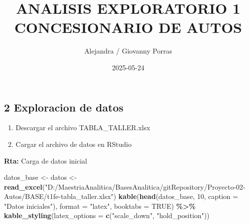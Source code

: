 \documentclass[
]{article}
\title{ANALISIS EXPLORATORIO 1 CONCESIONARIO DE AUTOS}
\author{Alejandra / Giovanny Porras}
\date{2025-05-24}
\newenvironment{Shaded}{\begin{snugshade}}{\end{snugshade}}
\newcommand{\AttributeTok}[1]{\textcolor[rgb]{0.13,0.29,0.53}{#1}}
\newcommand{\ConstantTok}[1]{\textcolor[rgb]{0.56,0.35,0.01}{#1}}
\newcommand{\DecValTok}[1]{\textcolor[rgb]{0.00,0.00,0.81}{#1}}
\newcommand{\FunctionTok}[1]{\textcolor[rgb]{0.13,0.29,0.53}{\textbf{#1}}}
\newcommand{\NormalTok}[1]{#1}
\newcommand{\OtherTok}[1]{\textcolor[rgb]{0.56,0.35,0.01}{#1}}
\newcommand{\SpecialCharTok}[1]{\textcolor[rgb]{0.81,0.36,0.00}{\textbf{#1}}}
\newcommand{\StringTok}[1]{\textcolor[rgb]{0.31,0.60,0.02}{#1}}
\providecommand{\tightlist}{%
  \setlength{\itemsep}{0pt}\setlength{\parskip}{0pt}}
\begin{document}
\maketitle

{
\setcounter{tocdepth}{2}
\tableofcontents
}
\subsection{2 Exploracion de datos}\label{exploracion-de-datos}

\begin{enumerate}
\def\labelenumi{\alph{enumi}.}
\tightlist
\item
  Descargar el archivo TABLA\_TALLER.xlsx
\item
  Cargar el archivo de datos en RStudio
\end{enumerate}

\textbf{Rta:} Carga de datos inicial

\begin{Shaded}
\begin{Highlighting}[]
\NormalTok{datos\_base }\OtherTok{\textless{}{-}}\NormalTok{ datos }\OtherTok{\textless{}{-}} \FunctionTok{read\_excel}\NormalTok{(}\StringTok{"D:/MaestriaAnalitica/BasesAnalitica/gitRepository/Proyecto{-}02{-}Autos/BASE/t1fe{-}tabla\_taller.xlsx"}\NormalTok{)}
\FunctionTok{kable}\NormalTok{(}\FunctionTok{head}\NormalTok{(datos\_base, }\DecValTok{10}\NormalTok{,  }\AttributeTok{caption =} \StringTok{"Datos iniciales"}\NormalTok{), }\AttributeTok{format =} \StringTok{"latex"}\NormalTok{, }\AttributeTok{booktabs =} \ConstantTok{TRUE}\NormalTok{) }\SpecialCharTok{\%\textgreater{}\%} 
  \FunctionTok{kable\_styling}\NormalTok{(}\AttributeTok{latex\_options =} \FunctionTok{c}\NormalTok{(}\StringTok{"scale\_down"}\NormalTok{, }\StringTok{"hold\_position"}\NormalTok{))}
\end{Highlighting}
\end{Shaded}
\end{document}
